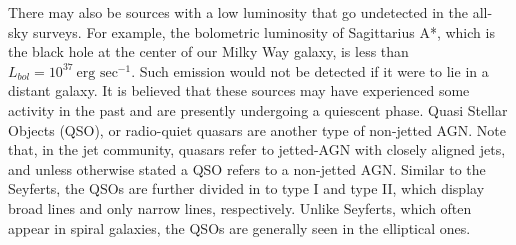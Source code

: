 There may also be sources with a low luminosity that go undetected in the all-sky surveys. For example, the bolometric luminosity of Sagittarius A*, which is the black hole at the center of our Milky Way galaxy, is less than $L_{bol}=10^{37}~\textrm{erg sec}^{-1}$. Such emission would not be detected if it were to lie in a distant galaxy. It is believed that these sources may have experienced some activity in the past and are presently undergoing a quiescent phase. Quasi Stellar Objects (QSO), or radio-quiet quasars are another type of non-jetted AGN. Note that, in the jet community, quasars refer to jetted-AGN with closely aligned jets, and unless otherwise stated a QSO refers to a non-jetted AGN. Similar to the Seyferts, the QSOs are further divided in to type I and type II, which display broad lines and only narrow lines, respectively. Unlike Seyferts, which often appear in spiral galaxies, the QSOs are generally seen in the elliptical ones.


